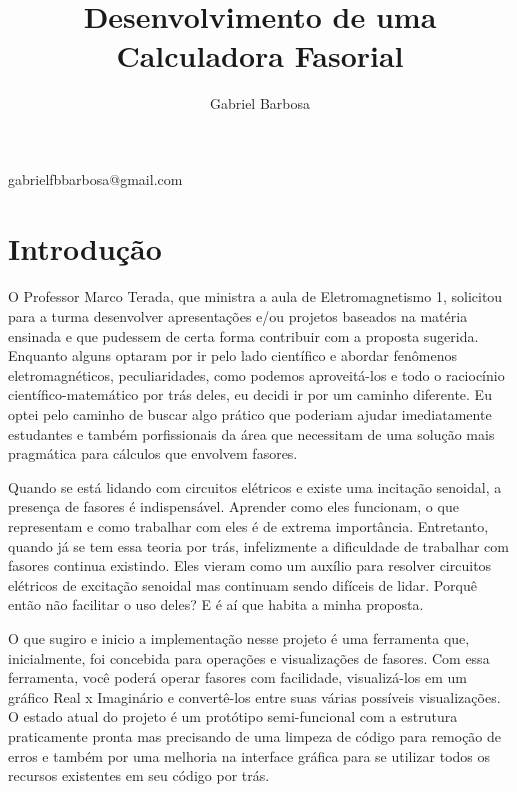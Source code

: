 \documentclass[conference,harvard, brazil]{sbatex}
\begin{document}
	\title{Desenvolvimento de uma Calculadora Fasorial}
	\author{Gabriel Barbosa}{gabrielfbbarbosa@gmail.com}
	\address{12/0050935}


	\section{Introdução}
	\paragraph{}O Professor Marco Terada, que ministra a aula de Eletromagnetismo 1, solicitou para a turma desenvolver apresentações e/ou projetos baseados na matéria ensinada e que pudessem de certa forma contribuir com a proposta sugerida. Enquanto alguns optaram por ir pelo lado científico e abordar fenômenos eletromagnéticos, peculiaridades, como podemos aproveitá-los e todo o raciocínio científico-matemático por trás deles, eu decidi ir por um caminho diferente. Eu optei pelo caminho de buscar algo prático que poderiam ajudar imediatamente estudantes e também porfissionais da área que necessitam de uma solução mais pragmática para cálculos que envolvem fasores.
	
	Quando se está lidando com circuitos elétricos e existe uma incitação senoidal, a presença de fasores é indispensável. Aprender como eles funcionam, o que representam e como trabalhar com eles é de extrema importância. Entretanto, quando já se tem essa teoria por trás, infelizmente a dificuldade de trabalhar com fasores continua existindo. Eles vieram como um auxílio para resolver circuitos elétricos de excitação senoidal mas continuam sendo difíceis de lidar. Porquê então não facilitar o uso deles? E é aí que habita a minha proposta.
	
	O que sugiro e inicio a implementação nesse projeto é uma ferramenta que, inicialmente, foi concebida para operações e visualizações de fasores. Com essa ferramenta, você poderá operar fasores com facilidade, visualizá-los em um gráfico Real x Imaginário e convertê-los entre suas várias possíveis visualizações. O estado atual do projeto é um protótipo semi-funcional com a estrutura praticamente pronta mas precisando de uma limpeza de código para remoção de erros e também por uma melhoria na interface gráfica para se utilizar todos os recursos existentes em seu código por trás.
	
\end{document}
